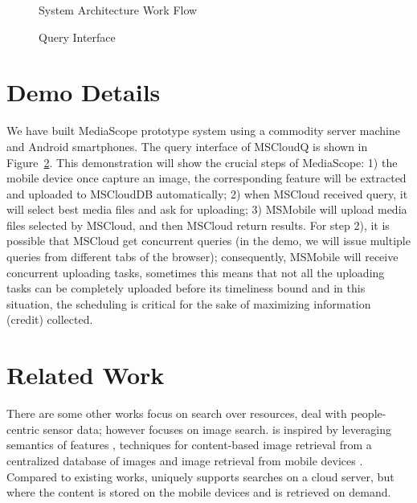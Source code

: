 \begin{figure}
\centering
{}
\caption{System Architecture Work Flow}
\label{fig:architecture}
\vspace{-0.5cm}
\end{figure}

\begin{figure}
\centering
{}
\caption{Query Interface}
\label{fig:interface}
\vspace{-0.8cm}
\end{figure}

\section{Demo Details}
We have built MediaScope prototype system using a commodity server machine and Android smartphones. The query interface of MSCloudQ is shown in Figure~\ref{fig:interface}. This demonstration will show the crucial steps of MediaScope: 1) the mobile device once capture an image, the corresponding feature will be extracted and uploaded to MSCloudDB automatically; 2) when MSCloud received query, it will select best media files and ask for uploading; 3) MSMobile will upload media files selected by MSCloud, and then MSCloud return results. For step 2), it is possible that MSCloud get concurrent queries (in the demo, we will issue multiple queries from different tabs of the browser); consequently, MSMobile will receive concurrent uploading tasks, sometimes this means that not all the uploading tasks can be completely uploaded before its timeliness bound and in this situation, the scheduling is critical for the sake of maximizing information (credit) collected.

\section{Related Work}
There are some other works focus on search over resources, \cite{sensorranking} deal with people-centric sensor data; however \mscope focuses on image search. \mscope is inspired by leveraging semantics of features \cite{crowdsearch,photonet}, techniques for content-based image retrieval from a centralized database of images \cite{faceted,virage,imgseek} and image retrieval from mobile devices \cite{content1,content2,content3}. Compared to existing works, \mscope uniquely supports searches on a cloud server, but where the content is stored on the mobile devices and is retrieved on demand. 